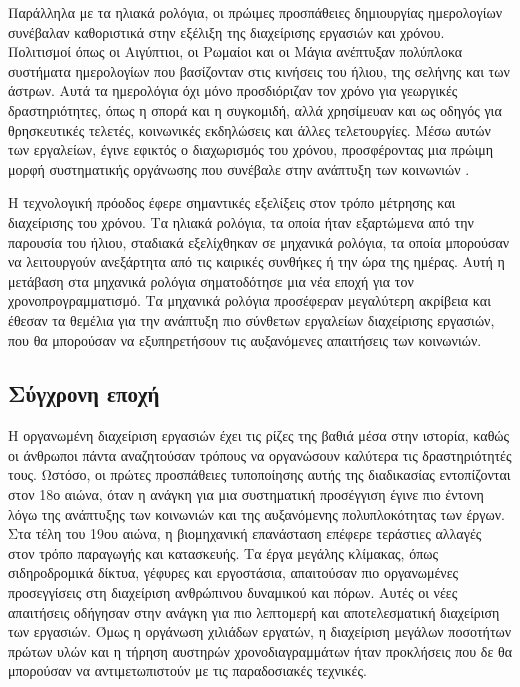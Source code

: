             Παράλληλα με τα ηλιακά ρολόγια, οι πρώιμες προσπάθειες δημιουργίας ημερολογίων συνέβαλαν καθοριστικά στην εξέλιξη της διαχείρισης εργασιών και χρόνου. Πολιτισμοί όπως οι Αιγύπτιοι, οι Ρωμαίοι και οι Μάγια ανέπτυξαν πολύπλοκα συστήματα ημερολογίων που βασίζονταν στις κινήσεις του ήλιου, της σελήνης και των άστρων. Αυτά τα ημερολόγια όχι μόνο προσδιόριζαν τον χρόνο για γεωργικές δραστηριότητες, όπως η σπορά και η συγκομιδή, αλλά χρησίμευαν και ως οδηγός για θρησκευτικές τελετές, κοινωνικές εκδηλώσεις και άλλες τελετουργίες. Μέσω αυτών των εργαλείων, έγινε εφικτός ο διαχωρισμός του χρόνου, προσφέροντας μια πρώιμη μορφή συστηματικής οργάνωσης που συνέβαλε στην ανάπτυξη των κοινωνιών \cite{Richards_2000}.

            Η τεχνολογική πρόοδος έφερε σημαντικές εξελίξεις στον τρόπο μέτρησης και διαχείρισης του χρόνου. Τα ηλιακά ρολόγια, τα οποία ήταν εξαρτώμενα από την παρουσία του ήλιου, σταδιακά εξελίχθηκαν σε μηχανικά ρολόγια, τα οποία μπορούσαν να λειτουργούν ανεξάρτητα από τις καιρικές συνθήκες ή την ώρα της ημέρας. Αυτή η μετάβαση στα μηχανικά ρολόγια σηματοδότησε μια νέα εποχή για τον χρονοπρογραμματισμό. Τα μηχανικά ρολόγια προσέφεραν μεγαλύτερη ακρίβεια και έθεσαν τα θεμέλια για την ανάπτυξη πιο σύνθετων εργαλείων διαχείρισης εργασιών, που θα μπορούσαν να εξυπηρετήσουν τις αυξανόμενες απαιτήσεις των κοινωνιών.

        \subsection{Σύγχρονη εποχή}
            Η οργανωμένη διαχείριση εργασιών έχει τις ρίζες της βαθιά μέσα στην ιστορία, καθώς οι άνθρωποι πάντα αναζητούσαν τρόπους να οργανώσουν καλύτερα τις δραστηριότητές τους. Ωστόσο, οι πρώτες προσπάθειες τυποποίησης αυτής της διαδικασίας εντοπίζονται στον 18ο αιώνα, όταν η ανάγκη για μια συστηματική προσέγγιση έγινε πιο έντονη λόγω της ανάπτυξης των κοινωνιών και της αυξανόμενης πολυπλοκότητας των έργων. Στα τέλη του 19ου αιώνα, η βιομηχανική επανάσταση επέφερε τεράστιες αλλαγές στον τρόπο παραγωγής και κατασκευής. Τα έργα μεγάλης κλίμακας, όπως σιδηροδρομικά δίκτυα, γέφυρες και εργοστάσια, απαιτούσαν πιο οργανωμένες προσεγγίσεις στη διαχείριση ανθρώπινου δυναμικού και πόρων. Αυτές οι νέες απαιτήσεις οδήγησαν στην ανάγκη για πιο λεπτομερή και αποτελεσματική διαχείριση των εργασιών. Όμως η οργάνωση χιλιάδων εργατών, η διαχείριση μεγάλων ποσοτήτων πρώτων υλών και η τήρηση αυστηρών χρονοδιαγραμμάτων ήταν προκλήσεις που δε θα μπορούσαν να αντιμετωπιστούν με τις παραδοσιακές τεχνικές.

